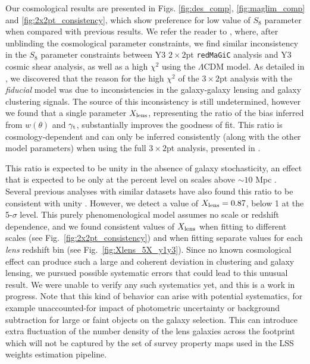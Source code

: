 \documentclass[aps, prd,twocolumn,superscriptaddress,nofootinbib,preprintnumbers]{revtex4-1}
\newcommand{\redmagic}{\texttt{redMaGiC} }
\begin{document}
Our cosmological results are presented in Figs. \ref{fig:des_comp}, \ref{fig:maglim_comp} and \ref{fig:2x2pt_consistency}, which show preference for low value of $S_8$ parameter when compared with previous results. We refer the reader to \citet{y3-3x2ptkp}, where, after unblinding the cosmological parameter constraints, we find similar inconsistency in the $S_8$ parameter constraints between Y3 $2\times2$pt \redmagic analysis and Y3 cosmic shear analysis, as well as a high $\chi^2$ using the $\Lambda$CDM model. As detailed in \citet{y3-3x2ptkp}, we discovered that the reason for the high $\chi^2$ of the $3\times2$pt analysis with the \textit{fiducial} model was due to inconsistencies in the galaxy-galaxy lensing and galaxy clustering signals. The source of this inconsistency is still undetermined, however we found that a single parameter $X_{\rm lens}$, representing the ratio of the bias inferred from $w(\theta)$ and $\gamma_{\rm t}$, substantially improves the goodness of fit. This ratio is cosmology-dependent and can only be inferred consistently (along with the other model parameters)  when using the full $3\times2$pt analysis, presented in \citet*{y3-3x2ptkp}.


This ratio is expected to be unity in the absence of galaxy stochasticity, an effect that is expected to be only at the percent level on scales above $\sim 10$ Mpc \citep{Desjacques_2018}. Several previous analyses with similar datasets have also found this ratio to be consistent with unity \citep{Mandelbaum_2013, Cacciato_2012, gglpaper}. However, we detect a value of $X_{\rm lens}=0.87$, below 1 at the 5-$\sigma$ level. This purely phenomenological model assumes no scale or redshift dependence, and we found consistent values of $X_{\rm lens}$ when fitting to different scales (see Fig.~\ref{fig:2x2pt_consistency}) and when fitting separate values for each \textit{lens} redshift bin (see Fig.~\ref{fig:Xlens_5X_y1y3}). 
Since no known cosmological effect can produce such a large and coherent deviation in clustering and galaxy lensing, we pursued possible systematic errors that could lead to this unusual result. 
We were unable to verify any such systematics yet, and this is a work in progress. Note that this kind of behavior can arise with potential systematics, for example unaccounted-for impact of photometric uncertainty or background subtraction for large or faint objects on the galaxy selection. This can introduce extra fluctuation of the number density of the lens galaxies across the footprint which will not be captured by the set of survey property maps used in the LSS weights estimation pipeline. 
\end{document}
